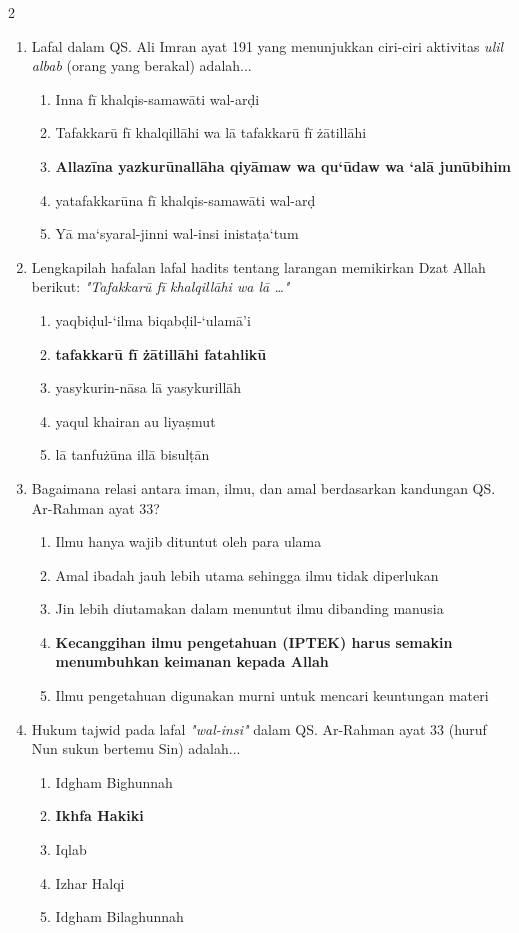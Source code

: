 \documentclass[10pt,a4paper]{article}
\begin{document}
\begin{multicols}{2}
\begin{enumerate}
    \item Lafal dalam QS. Ali Imran ayat 191 yang menunjukkan ciri-ciri aktivitas \textit{ulil albab} (orang yang berakal) adalah...
    \begin{enumerate}
      \item Inna fī khalqis-samawāti wal-arḍi
      \item Tafakkarū fī khalqillāhi wa lā tafakkarū fī żātillāhi
      \item \textbf{Allazīna yazkurūnallāha qiyāmaw wa qu‘ūdaw wa ‘alā junūbihim}
      \item yatafakkarūna fī khalqis-samawāti wal-arḍ
      \item Yā ma‘syaral-jinni wal-insi inistaṭa‘tum
    \end{enumerate}

    \item Lengkapilah hafalan lafal hadits tentang larangan memikirkan Dzat Allah berikut: \textit{"Tafakkarū fī khalqillāhi wa lā \dots"}
    \begin{enumerate}
      \item yaqbiḍul-‘ilma biqabḍil-‘ulamā’i
      \item \textbf{tafakkarū fī żātillāhi fatahlikū}
      \item yasykurin-nāsa lā yasykurillāh
      \item yaqul khairan au liyaṣmut
      \item lā tanfużūna illā bisulṭān
    \end{enumerate}

    \item Bagaimana relasi antara iman, ilmu, dan amal berdasarkan kandungan QS. Ar-Rahman ayat 33?
    \begin{enumerate}
      \item Ilmu hanya wajib dituntut oleh para ulama
      \item Amal ibadah jauh lebih utama sehingga ilmu tidak diperlukan
      \item Jin lebih diutamakan dalam menuntut ilmu dibanding manusia
      \item \textbf{Kecanggihan ilmu pengetahuan (IPTEK) harus semakin menumbuhkan keimanan kepada Allah}
      \item Ilmu pengetahuan digunakan murni untuk mencari keuntungan materi
    \end{enumerate}

    \item Hukum tajwid pada lafal \textit{"wal-insi"} dalam QS. Ar-Rahman ayat 33 (huruf Nun sukun bertemu Sin) adalah...
    \begin{enumerate}
      \item Idgham Bighunnah
      \item \textbf{Ikhfa Hakiki}
      \item Iqlab
      \item Izhar Halqi
      \item Idgham Bilaghunnah
    \end{enumerate}


\end{enumerate}
\end{multicols}
\end{document}
